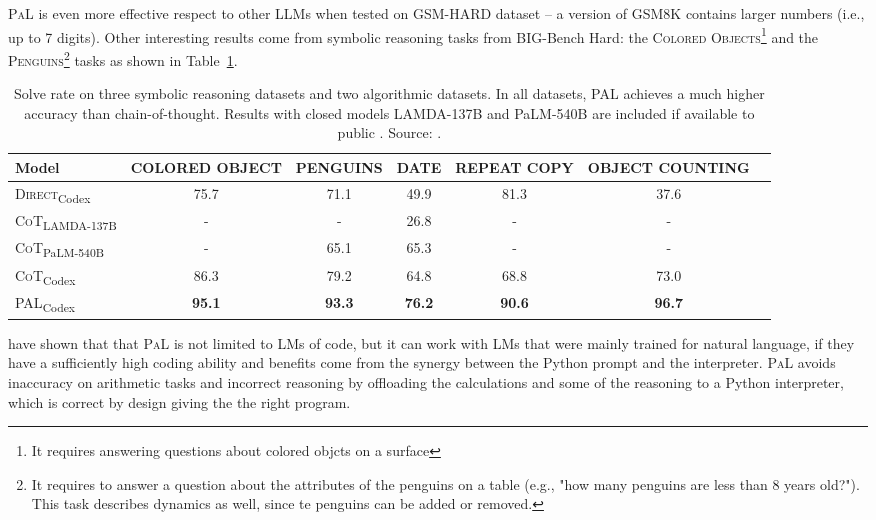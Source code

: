\textsc{PaL} is even more effective respect to other LLMs when tested on GSM-HARD dataset -- a version of GSM8K contains larger numbers (i.e., up to 7 digits).
Other interesting results come from symbolic reasoning tasks from BIG-Bench Hard: the \textsc{Colored Objects}\footnote{It requires answering questions about colored objcts on a surface} and the \textsc{Penguins}\footnote{It requires to answer a question about the attributes of the penguins on a table (e.g., "how many penguins are less than 8 years old?"). This task describes dynamics as well, since te penguins can be added or removed.} tasks as shown in Table~\ref{tab:pal-symbolic}.
\begin{table}[ht]
	\centering
	\begin{tabularx}{\textwidth}{Xcccccc}
		\hline
		\textbf{Model}                         & \textbf{COLORED OBJECT} & \textbf{PENGUINS} & \textbf{DATE} & \textbf{REPEAT COPY} & \textbf{OBJECT COUNTING} \\ \hline
		\textsc{Direct}\textsubscript{Codex}   & 75.7                    & 71.1              & 49.9          & 81.3                 & 37.6                     \\
		\textsc{CoT}\textsubscript{LAMDA-137B} & -                       & -                 & 26.8          & -                    & -                        \\
		\textsc{CoT}\textsubscript{PaLM-540B}  & -                       & 65.1              & 65.3          & -                    & -                        \\
		\textsc{CoT}\textsubscript{Codex}      & 86.3                    & 79.2              & 64.8          & 68.8                 & 73.0                     \\
		\textsc{PAL}\textsubscript{Codex}      & \textbf{95.1}           & \textbf{93.3}     & \textbf{76.2} & \textbf{90.6}        & \textbf{96.7}            \\ \hline
	\end{tabularx}
	\caption{Solve rate on three symbolic reasoning datasets and two algorithmic datasets. In all datasets, PAL achieves a much higher accuracy than chain-of-thought. Results with closed models LAMDA-137B and PaLM-540B are included if available to public \textcite{wei2022chain, suzgun2022challenging}. Source: \textcite{gao2022pal}.}
	\label{tab:pal-symbolic}
\end{table}
\textcite{gao2022pal} have shown that that \textsc{PaL} is not limited to LMs of code, but it can work with LMs that were mainly trained for natural language, if they have a sufficiently high coding ability and benefits come from the synergy between the Python prompt and the interpreter.
\textsc{PaL} avoids inaccuracy on arithmetic tasks and incorrect reasoning by offloading the calculations and some of the reasoning to a Python interpreter, which is correct by design giving the the right program.

